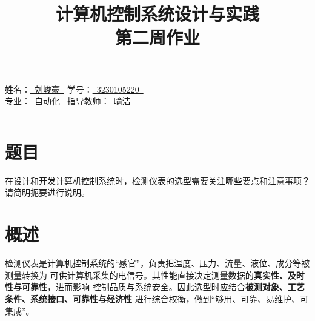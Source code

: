 \documentclass[12pt,a4paper]{ctexart}
\title{\textbf{计算机控制系统设计与实践\\ 第二周作业}}
\author{}
\date{}
\begin{document}
\maketitle
 
\noindent
姓\quad 名：\underline{\ 刘峻豪\ }\hspace{4em} 学\quad 号：\underline{\ 3230105220\ }\\[1.2ex]
专\quad 业：\underline{\ 自动化\ }\hspace{4em} 指导教师：\underline{\ 喻洁\ }
 
\bigskip
\hrule
\bigskip
 
\section*{题目}
在设计和开发计算机控制系统时，检测仪表的选型需要关注哪些要点和注意事项？请简明扼要进行说明。
 
\section{概述}
检测仪表是计算机控制系统的“感官”，负责把温度、压力、流量、液位、成分等被测量转换为
可供计算机采集的电信号。其性能直接决定测量数据的\textbf{真实性、及时性与可靠性}，进而影响
控制品质与系统安全。因此选型时应结合\textbf{被测对象、工艺条件、系统接口、可靠性与经济性}
进行综合权衡，做到“够用、可靠、易维护、可集成”。
 
\end{document}
